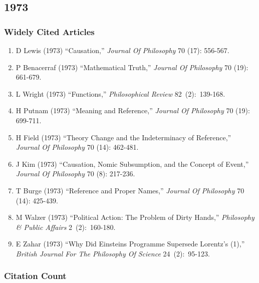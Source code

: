 \documentclass[
  10pt,
  letterpaper,
  DIV=11,
  numbers=noendperiod,
  twoside]{scrartcl}
\providecommand{\tightlist}{%
  \setlength{\itemsep}{0pt}\setlength{\parskip}{0pt}}\usepackage{longtable,booktabs,array}
\begin{document}
\newpage

\subsection{1973}\label{sec-s1973}

\subsubsection*{Widely Cited Articles}\label{widely-cited-articles-17}

\begin{enumerate}
\def\labelenumi{\arabic{enumi}.}
\tightlist
\item
  D Lewis (1973) ``Causation,'' \emph{Journal Of Philosophy} 70 (17):
  556-567.
\item
  P Benacerraf (1973) ``Mathematical Truth,'' \emph{Journal Of
  Philosophy} 70 (19): 661-679.
\item
  L Wright (1973) ``Functions,'' \emph{Philosophical Review}
  82~(2):~139-168.
\item
  H Putnam (1973) ``Meaning and Reference,'' \emph{Journal Of
  Philosophy} 70 (19): 699-711.
\item
  H Field (1973) ``Theory Change and the Indeterminacy of Reference,''
  \emph{Journal Of Philosophy} 70 (14): 462-481.
\item
  J Kim (1973) ``Causation, Nomic Subsumption, and the Concept of
  Event,'' \emph{Journal Of Philosophy} 70 (8): 217-236.
\item
  T Burge (1973) ``Reference and Proper Names,'' \emph{Journal Of
  Philosophy} 70 (14): 425-439.
\item
  M Walzer (1973) ``Political Action: The Problem of Dirty Hands,''
  \emph{Philosophy \& Public Affairs} 2~(2):~160-180.
\item
  E Zahar (1973) ``Why Did Einsteins Programme Supersede Lorentz's
  (1),'' \emph{British Journal For The Philosophy Of Science}
  24~(2):~95-123.
\end{enumerate}

\subsubsection*{Citation Count}\label{sec-count-1973}
\end{document}
